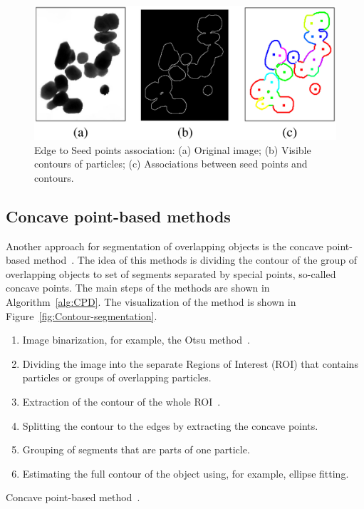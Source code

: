 \documentclass{lutmscthesis}[2010/09/22]
\begin{document}
\begin{figure} [ht]
  \includegraphics[width=\linewidth]{edge-to-seed-points.png}
  \caption{Edge to Seed points association: 
        (a) Original image; 
        (b) Visible contours of particles; 
        (c) Associations between seed points and contours.~\cite{BE-FRS}
    }
  \label{fig:seed-point-assoc}
\end{figure}

\subsection{Concave point-based methods}
Another approach for segmentation of overlapping objects is the concave point-based method~\cite{zafari2017comparison,Saddik,Zafari15}. The idea of this methods is dividing the contour of the group of overlapping objects to set of segments separated by special points, so-called concave points. The main steps of the methods are shown in Algorithm~\ref{alg:CPD}. The visualization of the method is shown in Figure~\ref{fig:Contour-segmentation}.

\begin{algorithm} [H]
    \begin{enumerate}
        \item Image binarization, for example, the Otsu method~\cite{otsu}.
        \item Dividing the image into the separate Regions of Interest (ROI) that contains particles or groups of overlapping particles.
        \item Extraction of the contour of the whole ROI~\cite{ROI}.
        \item Splitting the contour to the edges by extracting the concave points.
        \item Grouping of segments that are parts of one particle.
        \item Estimating the full contour of the object using, for example, ellipse fitting.
    \end{enumerate}
    \caption{Concave point-based method~\cite{Zafari15}.}\label{alg:CPD}
\end{algorithm}
\end{document}
